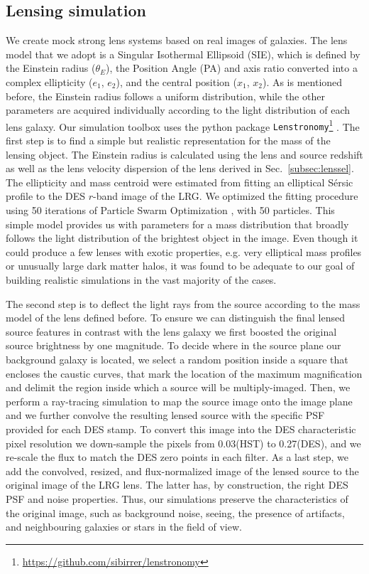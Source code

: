 \documentclass[tradiabstract,twocolumn]{aa}
\begin{document}
\subsection{Lensing simulation}\label{subsec:lenssimu}

We create mock strong lens systems based on real images of galaxies. The lens model that we adopt is a Singular Isothermal Ellipsoid (SIE), which is defined by the Einstein radius ($\theta_E$), the Position Angle (PA) and axis ratio converted into a complex ellipticity ($e_1$, $e_2$), and the central position ($x_1$, $x_2$). As is mentioned before, the Einstein radius follows a uniform distribution, while the other parameters are acquired individually according to the light distribution of each lens galaxy. Our simulation toolbox uses the python package {\tt Lenstronomy}\footnote{\url{https://github.com/sibirrer/lenstronomy}} \citep{Birrer2015,Birrer2018}. 
The first step is to find a simple but realistic representation for the mass of the lensing object. The Einstein radius is calculated using the lens and source redshift as well as the lens velocity dispersion of the lens derived in Sec.~\ref{subsec:lenssel}. The ellipticity and mass centroid were estimated from fitting an elliptical S\'ersic profile to the DES $r$-band image of the LRG. We optimized the fitting procedure using 50 iterations of Particle Swarm Optimization \citep[PSO;][]{Kennedy1995}, with 50 particles. This simple model provides us with parameters for a mass distribution that broadly follows the light distribution of the brightest object in the image. Even though it could produce a few lenses with exotic properties, e.g. very elliptical mass profiles or unusually large dark matter halos, it was found to be adequate to our goal of building realistic simulations in the vast majority of the cases.

The second step is to deflect the light rays from the source according to the mass model of the lens defined before. To ensure we can distinguish the final lensed source features in contrast with the lens galaxy we first boosted the original source brightness by one magnitude. To decide where in the source plane our background galaxy is located, we select a random position inside a square that encloses the caustic curves, that mark the location of the maximum magnification and delimit the region inside which a source will be multiply-imaged. Then, we perform a ray-tracing simulation to map the source image onto the image plane and we further convolve the resulting lensed source with the specific PSF provided for each DES stamp. To convert this image into the DES characteristic pixel resolution we down-sample the pixels from 0.03\arcsec (HST) to 0.27\arcsec (DES), and we re-scale the flux to match the DES zero points in each filter. As a last step, we add the convolved, resized, and flux-normalized image of the lensed source to the original image of the LRG lens. The latter has, by construction, the right DES PSF and noise properties. Thus, our simulations preserve the characteristics of the original image, such as background noise, seeing, the presence of artifacts, and neighbouring galaxies or stars in the field of view.
\end{document}
